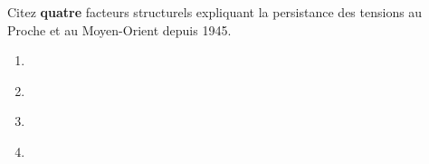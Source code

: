 \documentclass[11pt]{article}
\begin{document}
\begin{exercice}
Citez \textbf{quatre} facteurs structurels expliquant la persistance des tensions au Proche et au Moyen-Orient depuis 1945.
\begin{enumerate}
    \item \underline{\hspace{8cm}}
    \item \underline{\hspace{8cm}}
    \item \underline{\hspace{8cm}}
    \item \underline{\hspace{8cm}}
\end{enumerate}
\end{exercice}
\end{document}
